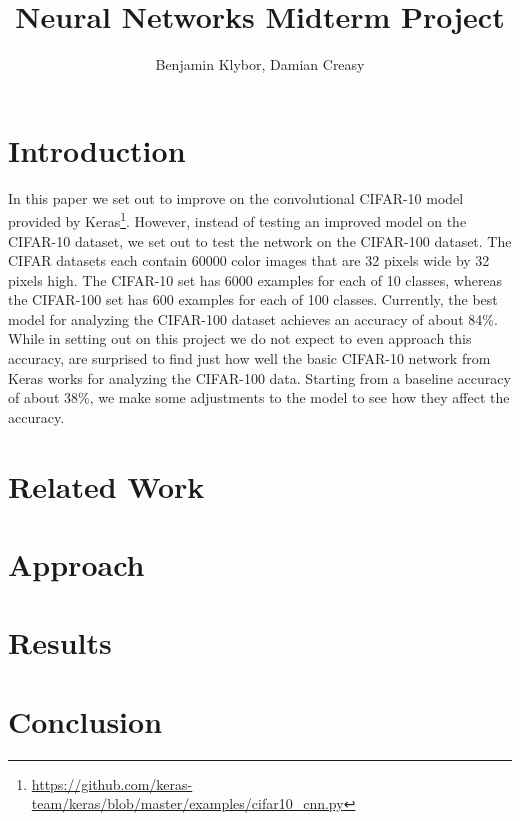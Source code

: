 \documentclass{article}
\title{Neural Networks Midterm Project}
\author{Benjamin Klybor, Damian Creasy}
\begin{document}
\maketitle

\section{Introduction}
In this paper we set out to improve on the convolutional CIFAR-10 model provided by Keras\footnote{\url{https://github.com/keras-team/keras/blob/master/examples/cifar10_cnn.py}}. However, instead of testing an improved model on the CIFAR-10 dataset, we set out to test the network on the CIFAR-100 dataset. The CIFAR datasets each contain 60000 color images that are 32 pixels wide by 32 pixels high. The CIFAR-10 set has 6000 examples for each of 10 classes, whereas the CIFAR-100 set has 600 examples for each of 100 classes. Currently, the best model for analyzing the CIFAR-100 dataset achieves an accuracy of about 84\%. While in setting out on this project we do not expect to even approach this accuracy, are surprised to find just how well the basic CIFAR-10 network from Keras works for analyzing the CIFAR-100 data. Starting from a baseline accuracy of about 38\%, we make some adjustments to the model to see how they affect the accuracy.

\section{Related Work}

\section{Approach}

\section{Results}

\section{Conclusion}
\end{document}
